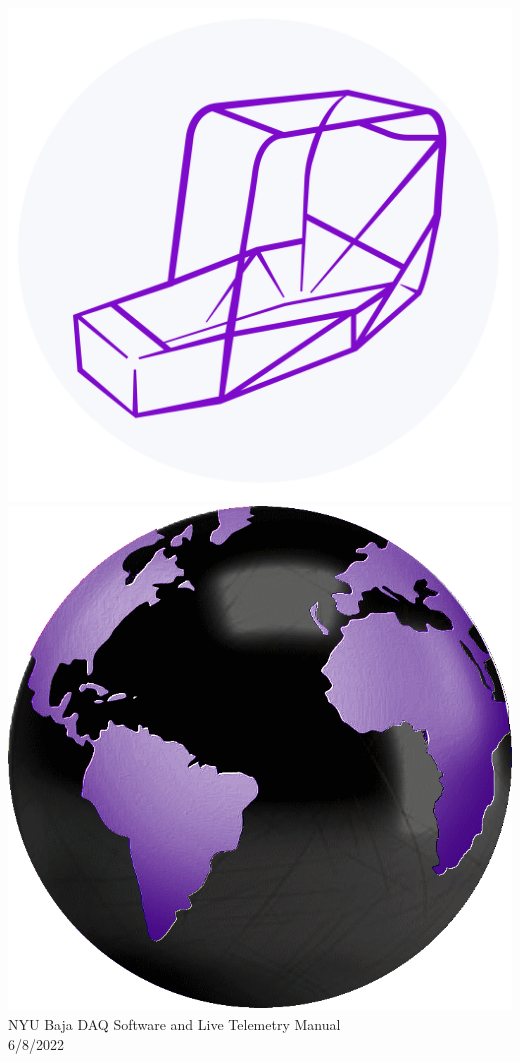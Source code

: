 \documentclass[12pt, letterpaper]{article}
\begin{document}
\vspace*{\fill}
\begin{center}
	\includegraphics[scale=0.14]{assets/motorsports_logo.png}
	\includegraphics[scale=0.04]{assets/fav32.png}
	\hspace*{.1in}
	\large{\\[0.5\baselineskip]}
	\large{NYU Baja DAQ Software and Live Telemetry Manual\\[0.4\baselineskip]}
	\normalsize{6/8/2022}
\end{center}
\vspace*{\fill}
\end{document}
